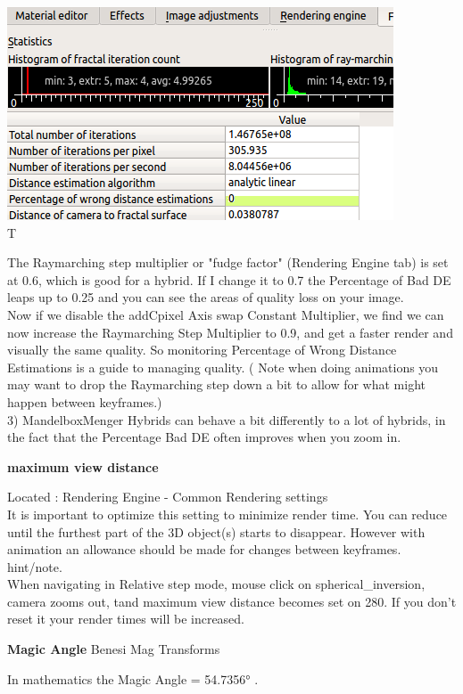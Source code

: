\includegraphics[width=4.51024in,height=2.48976in]{img/manual/media/image32.png}\\[2\baselineskip]T

The Raymarching step multiplier or "fudge factor" (Rendering Engine tab)
is set at 0.6, which is good for a hybrid. If I change it to 0.7 the
Percentage of Bad DE leaps up to 0.25 and you can see the areas of
quality loss on your image.\\[2\baselineskip]Now if we disable the
addCpixel Axis swap Constant Multiplier, we find we can now increase the
Raymarching Step Multiplier to 0.9, and get a faster render and visually
the same quality. So monitoring Percentage of Wrong Distance Estimations
is a guide to managing quality. ( Note when doing animations you may
want to drop the Raymarching step down a bit to allow for what might
happen between keyframes.)\\[2\baselineskip]3) MandelboxMenger Hybrids
can behave a bit differently to a lot of hybrids, in the fact that the
Percentage Bad DE often improves when you zoom in.

\textbf{maximum view distance}

Located : Rendering Engine - Common Rendering
settings\\[2\baselineskip]It is important to optimize this setting to
minimize render time. You can reduce until the furthest part of the 3D
object(s) starts to disappear. However with animation an allowance
should be made for changes between
keyframes.\\[2\baselineskip]hint/note.\\
When navigating in Relative step mode, mouse click on
spherical\_inversion, camera zooms out, tand maximum view distance
becomes set on 280. If you don't reset it your render times will be
increased.

\textbf{Magic Angle} Benesi Mag Transforms

In mathematics the Magic Angle = 54.7356° .

